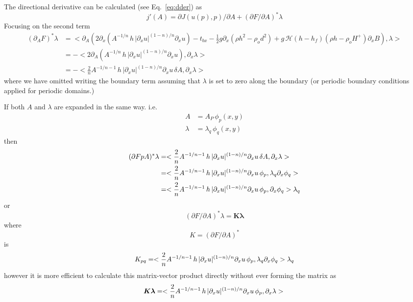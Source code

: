 \documentclass[10pt,a4paper]{book}
\newcommand{\He}{\mathcal{H}}
\newcommand{\p}{\partial}
\newcommand{\tbx}{t_{bx}}
\begin{document}
The directional derivative can be calculated (see Eq.~\ref{eq:dder}) as
\begin{equation}
j'(A)= \p J(u(p),p)/ \p A + (\p F / \p A)^\ast  \lambda
\label{eq:dder2}
\end{equation}
Focusing on the second term
\begin{align*}
  (\p_A F )^\ast  \lambda & = <\p_A  \left ( 2 \p_x ( A^{-1/n} \, h \, | \p_x u|^{(1-n)/n}   \p_x u ) - \tbx - \frac{1}{2} g \p_x (\rho h^2 - \rho_o d^2)+ g\,\He(h-h_f) (\rho h -\rho_o H^{+}) \p_x B \right ) , \lambda>\\
                             & = - <  2 \p_A \left ( A^{-1/n} \, h \, | \p_x u|^{(1-n)/n}   \p_x u \right ) , \p_x \lambda>\\
                             & = - <  \frac{2}{n}  A^{-1/n-1} \, h \, | \p_x u|^{(1-n)/n}   \p_x u \, \delta A, \p_x \lambda>
\end{align*}
where we have omitted writing the boundary term assuming that
$\lambda$ is set to zero along the boundary (or periodic boundary
conditions applied for periodic domains.)

If both $A$ and $\lambda$ are expanded in the same way. i.e.
\begin{align*} 
        A & = A_P \, \phi_p(x,y) \\ 
 \lambda & =\lambda_q \, \phi_q(x,y)
\end{align*}
then
\begin{align*}
  (\p F \/p A)^{\ast} \lambda &= <  \frac{2}{n}  A^{-1/n-1} \, h \, | \p_x u|^{(1-n)/n}   \p_x u \, \delta A, \p_x \lambda> \\
            &=    <  \frac{2}{n}  A^{-1/n-1} \, h \, | \p_x u|^{(1-n)/n}   \p_x u \, \phi_p, \lambda_q \p_x \phi_q> \\
            &=    <  \frac{2}{n}  A^{-1/n-1} \, h \, | \p_x u|^{(1-n)/n}   \p_x u \, \phi_p, \p_x \phi_q>  \lambda_q \\
\end{align*}
or
 \[
 (\p F /\p A)^{\ast} \lambda = \bm{K} \bm{\lambda}
\]
where
\[
K= (\p F /\p A)^{\ast} 
\]
is
\[
K_{pq}=<  \frac{2}{n}  A^{-1/n-1} \, h \, | \p_x u|^{(1-n)/n}   \p_x u \, \phi_p, \lambda_q \p_x \phi_q>  \lambda_q \\
\]
however it is more efficient to calculate this matrix-vector product
directly without ever forming the matrix as
\[
  \bm{K} \bm{\lambda}= <  \frac{2}{n}  A^{-1/n-1} \, h \, | \p_x u|^{(1-n)/n}   \p_x u \, \phi_p, \p_x \lambda> \\
\]
\end{document}
